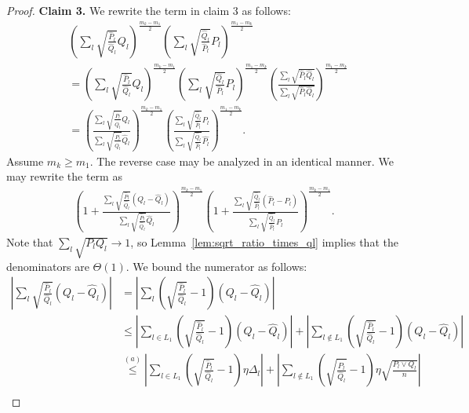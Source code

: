 \documentclass{article}
\begin{document}
\begin{proof}
\noindent \textbf{Claim 3.} 
We rewrite the term in claim 3 as follows:
\begin{align*}
& \left( \sum_l \sqrt{\frac{\hat{P}_l}{\hat{Q}_l}} Q_l \right)^{\frac{m_k - m_1}{2}} 
 \left( \sum_l \sqrt{\frac{\hat{Q}_l}{\hat{P}_l}} P_l \right)^{\frac{m_1 - m_k}{2}} \\
&= \left( \sum_l \sqrt{\frac{\hat{P}_l}{\hat{Q}_l}} Q_l \right)^{\frac{m_k - m_1}{2}} 
 \left( \sum_l \sqrt{\frac{\hat{Q}_l}{\hat{P}_l}} P_l \right)^{\frac{m_1 - m_k}{2}} 
   \left( \frac{\sum_l \sqrt{\hat{P}_l \hat{Q}_l}}{\sum_l \sqrt{\hat{P}_l \hat{Q}_l}} \right)^{\frac{m_1 - m_k}{2}} \\
&=  \left( 
   \frac{\sum_l \sqrt{\frac{\hat{P}_l}{\hat{Q}_l}} Q_l}
        {\sum_l \sqrt{\frac{\hat{P}_l}{\hat{Q}_l}} \hat{Q}_l} 
     \right)^{\frac{m_k - m_1}{2}} 
   \left( \frac{\sum_l \sqrt{\frac{\hat{Q}_l}{\hat{P}_l}} P_l}
         {\sum_l \sqrt{\frac{\hat{Q}_l}{\hat{P}_l}} \hat{P_l} } \right)^{\frac{m_1 - m_k}{2}}. 
\end{align*}
Assume $m_k \geq m_1$. The reverse case may be analyzed in an identical manner. We may rewrite the term as
\begin{align*}
\left( 1 + 
   \frac{\sum_l \sqrt{\frac{\hat{P}_l}{\hat{Q}_l}} (Q_l - \hat{Q}_l)}
        {\sum_l \sqrt{\frac{\hat{P}_l}{\hat{Q}_l}} \hat{Q}_l} 
     \right)^{\frac{m_k - m_1}{2}} 
   \left( 1+ \frac{\sum_l \sqrt{\frac{\hat{Q}_l}{\hat{P}_l}} (\hat{P}_l - P_l)}
         {\sum_l \sqrt{\frac{\hat{Q}_l}{\hat{P}_l}} P_l } \right)^{\frac{m_k - m_1}{2}}. 
\end{align*}
Note that $\sum_l \sqrt{P_l Q_l} \to 1$, so Lemma~\ref{lem:sqrt_ratio_times_ql} implies that the denominators are $\Theta(1).$ We bound the numerator as follows:
\begin{align*}
\left| \sum_l \sqrt{\frac{\hat{P}_l}{\hat{Q}_l}} (Q_l - \hat{Q}_l) \right|  &= 
  \left|  \sum_l \left( \sqrt{\frac{\hat{P}_l}{\hat{Q}_l}} -1 \right) (Q_l - \hat{Q}_l) 
 \right| \\
& \leq \left| \sum_{l \in L_1} \left( \sqrt{\frac{\hat{P}_l}{\hat{Q}_l}} -1 \right) (Q_l - \hat{Q}_l) \right| +  %
  \left| \sum_{l \notin L_1} \left( \sqrt{\frac{\hat{P}_l}{\hat{Q}_l}} -1 \right) (Q_l - \hat{Q}_l) \right| \\
%
& \stackrel{(a)} \leq \left| \sum_{l \in L_1} \left( \sqrt{\frac{\hat{P}_l}{\hat{Q}_l}} -1 \right) \eta \Delta_l \right| +  %
  \left| \sum_{l \notin L_1} \left( \sqrt{\frac{\hat{P}_l}{\hat{Q}_l}} -1 \right) \eta \sqrt{ \frac{P_l \vee Q_l}{n}}  \right| \\

\end{align*}
\end{proof}
\end{document}
